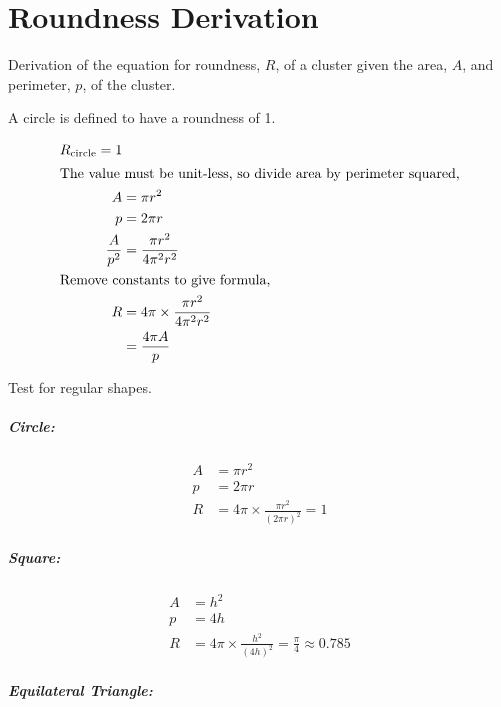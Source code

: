
\chapter{Roundness Derivation}
\label{app:roundness_derivation}

Derivation of the equation for roundness, $R$, of a cluster given the area,
$A$, and perimeter, $p$, of the cluster.

A circle is defined to have a roundness of 1.

\begin{align}
	R_\textrm{circle} = 1 \\
\intertext{The value must be unit-less, so divide area by perimeter squared,}
	A &= \pi r^2 \\
	p &= 2\pi r \\
	\frac{A}{p^2} &= \frac{\pi r^2}{4\pi^2 r^2} \\
\intertext{Remove constants to give formula,}
	R &= 4\pi \times \frac{\pi r^2}{4\pi^2 r^2} \\
		&= \frac{4\pi A}{p}
\end{align}

Test for regular shapes.

\paragraph{Circle:}
\label{par:circle}

\begin{align}
	A &= \pi r^2 \\
	p &= 2\pi r \\
	R &= 4\pi \times \frac{\pi r^2}{{(2\pi r)}^2} = 1
\end{align}

\paragraph{Square:}
\label{par:square}

\begin{align}
	A &= h^2 \\
	p &= 4h \\
	R &= 4\pi \times \frac{h^2}{{(4h)}^2} = \frac{\pi}{4} \approx 0.785
\end{align}

\paragraph{Equilateral Triangle:}
\label{par:equalateral_triangle}


